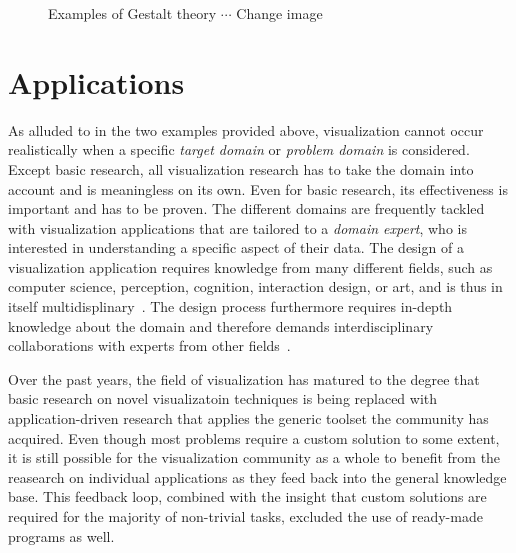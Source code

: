 \begin{figure}
  \centering
  \caption{Examples of Gestalt theory $\cdots$ Change image}
  \label{fig:motivation:gestalt}
\end{figure}

\section{Applications}
As alluded to in the two examples provided above, visualization cannot occur realistically when a specific \emph{target domain} or \emph{problem domain} is considered.  Except basic research, all visualization research has to take the domain into account and is meaningless on its own.  Even for basic research, its effectiveness is important and has to be proven.  The different domains are frequently tackled with visualization applications that are tailored to a \emph{domain expert}, who is interested in understanding a specific aspect of their data.  The design of a visualization application requires knowledge from many different fields, such as computer science, perception, cognition, interaction design, or art, and is thus in itself multidisplinary~\cite{defanti1989visualization}.  The design process furthermore requires in-depth knowledge about the domain and therefore demands interdisciplinary collaborations with experts from other fields~\cite{kirby2013visualization}.

Over the past years, the field of visualization has matured to the degree that basic research on novel visualizatoin techniques is being replaced with application-driven research that applies the generic toolset the community has acquired.  Even though most problems require a custom solution to some extent, it is still possible for the visualization community as a whole to benefit from the reasearch on individual applications as they feed back into the general knowledge base.  This feedback loop, combined with the insight that custom solutions are required for the majority of non-trivial tasks, excluded the use of ready-made programs as well.


